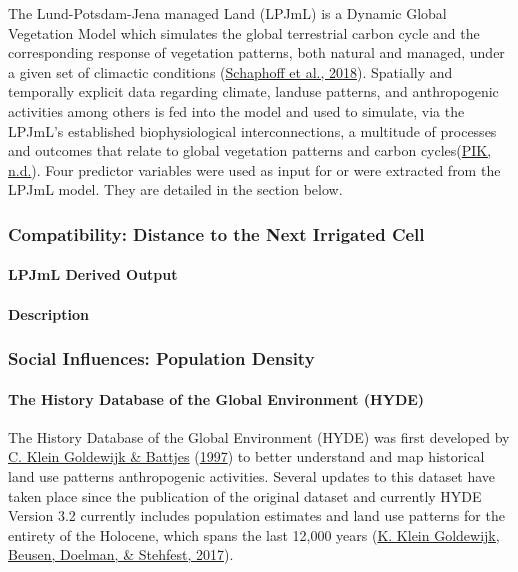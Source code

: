 \documentclass[12pt,twoside]{reedthesis}
\begin{document}
The Lund-Potsdam-Jena managed Land (LPJmL) is a Dynamic Global Vegetation Model which simulates the global terrestrial carbon cycle and the corresponding response of vegetation patterns, both natural and managed, under a given set of climactic conditions (\protect\hyperlink{ref-schaphoffLPJmL4DynamicGlobal2018}{Schaphoff et al., 2018}). Spatially and temporally explicit data regarding climate, landuse patterns, and anthropogenic activities among others is fed into the model and used to simulate, via the LPJmL's established biophysiological interconnections, a multitude of processes and outcomes that relate to global vegetation patterns and carbon cycles(\protect\hyperlink{ref-pikLPJmLLundPotsdamJenaManaged}{PIK, n.d.}). Four predictor variables were used as input for or were extracted from the LPJmL model. They are detailed in the section below.

\hypertarget{dist}{%
\subsubsection{Compatibility: Distance to the Next Irrigated Cell}\label{dist}}

\hypertarget{lpjml-derived-output}{%
\paragraph{LPJmL Derived Output}\label{lpjml-derived-output}}

\hypertarget{description-2}{%
\paragraph{Description}\label{description-2}}

\hypertarget{social-influences-population-density}{%
\subsubsection{Social Influences: Population Density}\label{social-influences-population-density}}

\hypertarget{the-history-database-of-the-global-environment-hyde}{%
\paragraph{The History Database of the Global Environment (HYDE)}\label{the-history-database-of-the-global-environment-hyde}}

The History Database of the Global Environment (HYDE) was first developed by \protect\hyperlink{ref-kleingoldewijkHundredYear18901997}{C. Klein Goldewijk \& Battjes} (\protect\hyperlink{ref-kleingoldewijkHundredYear18901997}{1997}) to better understand and map historical land use patterns anthropogenic activities. Several updates to this dataset have taken place since the publication of the original dataset and currently HYDE Version 3.2 currently includes population estimates and land use patterns for the entirety of the Holocene, which spans the last 12,000 years (\protect\hyperlink{ref-kleingoldewijkAnthropogenicLandUse2017}{K. Klein Goldewijk, Beusen, Doelman, \& Stehfest, 2017}).
\end{document}
